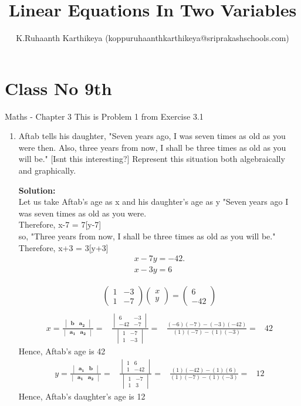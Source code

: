 \documentclass[12pt]{article}
\title{Linear Equations In Two Variables}
\author{K.Ruhaanth Karthikeya (koppuruhaanthkarthikeya@sriprakashschools.com)}
\newcommand{\myvec}[1]{\ensuremath{\begin{pmatrix}#1\end{pmatrix}}}
\newcommand{\mydet}[1]{\ensuremath{\begin{vmatrix}#1\end{vmatrix}}}
\newcommand{\solution}{\noindent \textbf{Solution: }}
\providecommand{\brak}[1]{\ensuremath{\left(#1\right)}}
\let\vec\mathbf
\begin{document}
\maketitle
\section*{Class No 9th} { Maths - Chapter 3}
This is Problem 1 from Exercise 3.1
\begin{enumerate}
\item Aftab tells his daughter, "Seven years ago,
I was seven times as old as you were then. Also, three years from 
now, I shall be three times as old as you will be." [Isnt this interesting?] Represent this situation both algebraically and graphically.

\solution \\ Let us take Aftab's age as x and his daughter's age as y
"Seven years ago I was seven times as old as you were.\\
Therefore, x-7 = 7[y-7]\\
so,
"Three years from now, I shall be three times as old as you will be."
Therefore, x+3 = 3[y+3]\\
\begin{align}
x-7y = -42. \\
x-3y=6
\end{align}

\begin{align}
\myvec{1&-3\\1&-7}\myvec{x\\y}=\myvec{6\\-42}\\
\end{align}
\begin{align}
x =\frac{\mydet{ \vec{b} & \vec{a_2}}}{\mydet{ \vec{a_1} & \vec{a_2}}} = &
\frac{\mydet{6&-3\\-42&-7}}{ \mydet{1&-7\\1&-3}} =&
\frac{\brak{-6}\brak{-7} - \brak{-3}\brak{-42}}{\brak{1} \brak{-7}-
\brak{1}\brak{-3}} =& 42
\end{align}
Hence, Aftab's age is 42
\begin{align}
y = \frac{\mydet{ \vec{a_1} & \vec{b}}}{\mydet{ \vec{a_1} & \vec{a_2}}}=&
\frac{\mydet{1&6\\1&-42}}{ \mydet{1&-7\\1&3}}=&
\frac{\brak{1} \brak{-42} - \brak{1}\brak{6}}{\brak{1}\brak{-7} - \brak{1}\brak{-3}} =& 12
\end{align}
 Hence, Aftab's daughter's age is 12

\end{enumerate}
\end{document}
